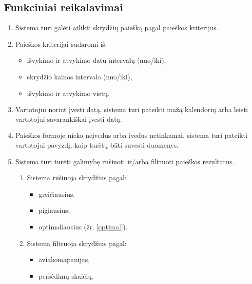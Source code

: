 \documentclass{VUMIFPSkursinis}
\begin{document}
            \subsection{Funkciniai reikalavimai}
                \begin{enumerate}[label=\textbf{FR\arabic*}.]
                    \item Sistema turi galėti atlikti skrydžių paiešką pagal paieškos kriterijus.
                    \item Paieškos kriterijai sudaromi iš:
                    \begin{itemize}
                    	\item išvykimo ir atvykimo datų intervalų (nuo/iki),
                    	\item skrydžio kainos intervalo (nuo/iki),
                    	\item išvykimo ir atvykimo vietų.
                    \end{itemize}
                    \item Vartotojui norint įvesti datą, sistema turi pateikti mažą kalendorių arba leisti vartotojui savarankiškai įvesti datą.
                    \item Paieškos formoje nieko neįvedus arba įvedus netinkamai, sistema turi pateikti vartotojui pavyzdį, kaip turėtų būti suvesti duomenys.
                    \item Sistema turi turėti galimybę rūšiuoti ir/arba  filtruoti paieškos rezultatus.
                    \begin{enumerate}[label*=\textbf{\arabic*}.]
                        \item Sistema rūšiuoja skrydžius pagal:
                        \begin{itemize}
                            \item greičiausius,
                            \item pigiausius,
                            \item optimaliausius (žr. \ref{optimal}).
                        \end{itemize}
                        \item Sistema filtruoja skrydžius pagal:
                        \begin{itemize}
                            \item aviakomapanijas,
                            \item persėdimų skaičių.
                        \end{itemize}

\end{enumerate}
\end{enumerate}
\end{document}
